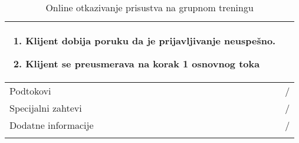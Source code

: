 \documentclass[../grupniTreninzi.tex]{subfiles}
\begin{document}
\begin{longtable}{| p{} | p{} |}
\begin{enumerate}
            \begin{enumerate}
                \item Klijent dobija poruku da je prijavljivanje neuspešno.
                \item Klijent se preusmerava na korak 1 osnovnog toka
            \end{enumerate}    
    \end{enumerate}\\
\hline
    Podtokovi & /\\
\hline
    Specijalni zahtevi & /\\
\hline
    Dodatne informacije & /\\
\hline
\caption{Online otkazivanje prisustva na grupnom treningu} %
\end{longtable}
\end{document}
